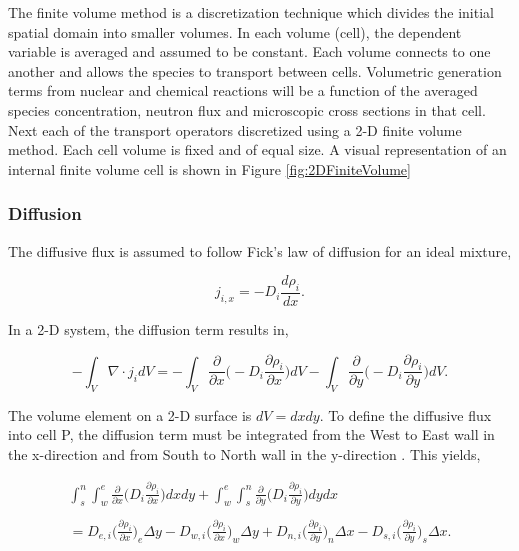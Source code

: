 The finite volume method is a discretization technique which divides the initial spatial domain into smaller volumes. In each volume (cell), the dependent variable is averaged and assumed to be constant. Each volume connects to one another and allows the species to transport between cells. Volumetric generation terms from nuclear and chemical reactions will be a function of the averaged species concentration, neutron flux and microscopic cross sections in that cell. Next each of the transport operators discretized using a 2-D finite volume method. Each cell volume is fixed and of equal size. A visual representation of an internal finite volume cell is shown in Figure \ref{fig:2DFiniteVolume}


 
\subsubsection{Diffusion}
The diffusive flux is assumed to follow Fick's law of diffusion for an ideal mixture,

\begin{equation}
    j_{i,x} = -D_{i}\frac{d\rho_{i}}{dx}.
\end{equation}

\noindent In a 2-D system, the diffusion term results in,

\begin{equation}
    -\int_{V}\nabla \cdot j_{i}dV = -\int_{V}\frac{\partial }{\partial x}\bigg( -D_{i}\frac{\partial \rho_{i}}{\partial x}\bigg)dV - \int_{V}\frac{\partial }{\partial y}\bigg( -D_{i}\frac{\partial \rho_{i}}{\partial y}\bigg)dV.
\end{equation}

\noindent The volume element on a 2-D surface is $dV = dxdy$. To define the diffusive flux into cell P, the diffusion term must be integrated from the West to East wall in the x-direction and from South to North wall in the y-direction \cite{versteeg2007}. This yields,

\begin{equation}
\begin{split}
    \int_{s}^{n}\int_{w}^{e}\frac{\partial }{\partial x}\bigg( D_{i}\frac{\partial \rho_{i}}{\partial x}\bigg)dxdy + \int_{w}^{e}\int_{s}^{n}\frac{\partial }{\partial y}\bigg( D_{i}\frac{\partial \rho_{i}}{\partial y}\bigg)dydx \\ 
    \\
    = D_{e,i}\bigg(\frac{\partial \rho_{i}}{\partial x}\bigg)_{e}\Delta y -D_{w,i}\bigg(\frac{\partial \rho_{i}}{\partial x}\bigg)_{w}\Delta y
    + D_{n,i}\bigg(\frac{\partial \rho_{i}}{\partial y}\bigg)_{n}\Delta x - D_{s,i}\bigg(\frac{\partial \rho_{i}}{\partial y}\bigg)_{s}\Delta x.
\end{split}
\end{equation}

